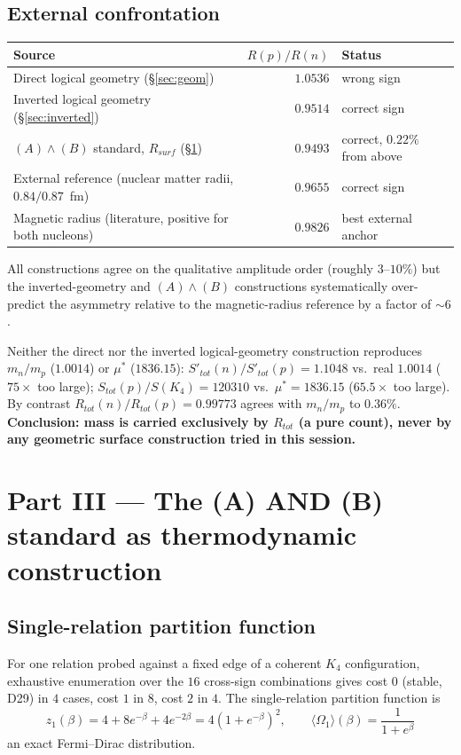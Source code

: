 \documentclass[11pt]{article}
\def\texorpdfstring#1#2{#2}%
\begin{document}
\subsection{External confrontation}
\label{sec:external}
\begin{center}
\begin{tabularx}{\textwidth}{Yrl}
\toprule
Source & $R(p)/R(n)$ & Status \\
\midrule
Direct logical geometry (\S\ref{sec:geom}) & $1.0536$ & wrong sign \\
Inverted logical geometry (\S\ref{sec:inverted}) & $0.9514$ & correct sign \\
$(A)\wedge(B)$ standard, $R_{surf}$ (\S\ref{sec:etalon}) & $0.9493$ & correct, $0.22\%$ from above \\
External reference (nuclear matter radii, $0.84/0.87$~fm) & $0.9655$ & correct sign \\
Magnetic radius (literature, positive for both nucleons) & $0.9826$ & best external anchor \\
\bottomrule
\end{tabularx}
\end{center}
All constructions agree on the qualitative amplitude order (roughly $3$--$10\%$) but the inverted-geometry and $(A)\wedge(B)$ constructions systematically over-predict the asymmetry relative to the magnetic-radius reference by a factor of $\sim6$.

\begin{negativebox}
Neither the direct nor the inverted logical-geometry construction reproduces $m_n/m_p$ ($1.0014$) or $\mu^*$ ($1836.15$): $S'_{tot}(n)/S'_{tot}(p)=1.1048$ vs.\ real $1.0014$ ($75\times$ too large); $S_{tot}(p)/S(K_4)=120310$ vs.\ $\mu^*=1836.15$ ($65.5\times$ too large). By contrast $R_{tot}(n)/R_{tot}(p)=0.99773$ agrees with $m_n/m_p$ to $0.36\%$. \textbf{Conclusion: mass is carried exclusively by $R_{tot}$ (a pure count), never by any geometric surface construction tried in this session.}
\end{negativebox}

\section{Part III --- The \texorpdfstring{$(A)\wedge(B)$}{(A) AND (B)} standard as thermodynamic construction}
\label{sec:etalon}

\subsection{Single-relation partition function}
For one relation probed against a fixed edge of a coherent $K_4$ configuration, exhaustive enumeration over the $16$ cross-sign combinations gives cost $0$ (stable, D29) in $4$ cases, cost $1$ in $8$, cost $2$ in $4$. The single-relation partition function is
\begin{equation}
z_1(\beta) = 4+8e^{-\beta}+4e^{-2\beta} = 4(1+e^{-\beta})^2, \qquad \langle\Omega_1\rangle(\beta)=\frac{1}{1+e^{\beta}}
\end{equation}
an exact Fermi--Dirac distribution.
\end{document}
